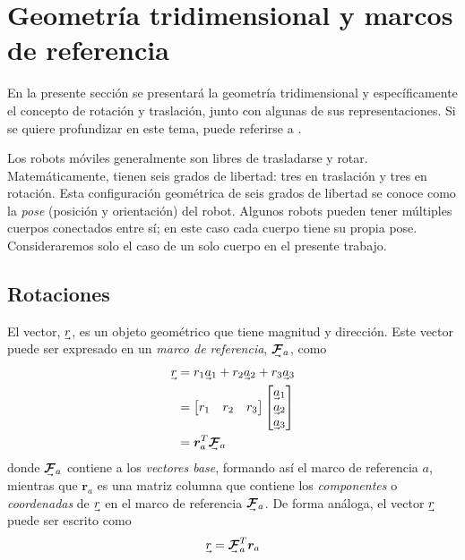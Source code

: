 \section{Geometría tridimensional y marcos de referencia}
En la presente sección se presentará la geometría tridimensional y específicamente el concepto de rotación y traslación, junto con algunas de sus representaciones. Si se quiere profundizar en este tema, puede referirse a \cite{barfoot2020}.%

Los robots móviles generalmente son libres de trasladarse y rotar. Matemáticamente, tienen seis grados de libertad: tres en traslación y tres en rotación. Esta configuración geométrica de seis grados de libertad se conoce como la \textit{pose} (posición y orientación) del robot. Algunos robots pueden tener múltiples cuerpos conectados entre sí; en este caso cada cuerpo tiene su propia pose. Consideraremos solo el caso de un solo cuerpo en el presente trabajo.

\subsection{Rotaciones}
El vector, $\undervec{r}$, es un objeto geométrico que tiene magnitud y dirección. Este vector puede ser expresado en un \textit{marco de referencia}, $\undervec{\bm{\mathcal{F}}}_a$, como
\begin{align}
    \undervec{r} &= r_1\undervec{a}_1+ r_2\undervec{a}_2 + r_3\undervec{a}_3 \\
    &= 
    \begin{bmatrix}
    r_1 & r_2 & r_3
    \end{bmatrix}
    \begin{bmatrix}
    \undervec{a}_1 \\ 
    \undervec{a}_2 \\
    \undervec{a}_3
    \end{bmatrix}
    \\
    &= \bm{r}_a^T\undervec{\bm{\mathcal{F}}}_a
\end{align}
donde $\undervec{\bm{\mathcal{F}}}_a$ contiene a los \textit{vectores base}, formando así el marco de referencia $a$, mientras que $\bm{r}_a$ es una matriz columna que contiene los \textit{componentes} o \textit{coordenadas} de $\undervec{r}$ en el marco de referencia $\undervec{\bm{\mathcal{F}}}_a$. De forma análoga, el vector $\undervec{r}$ puede ser escrito como
\begin{equation}
    \undervec{r} = \undervec{\bm{\mathcal{F}}}_a^T \bm{r}_a
\end{equation}

